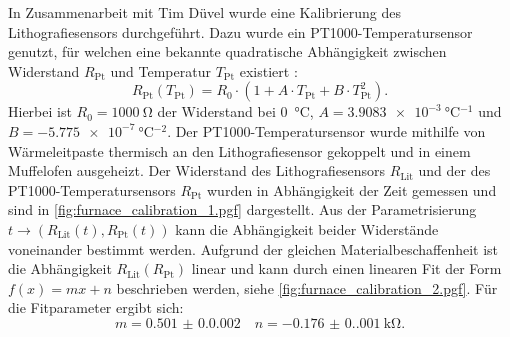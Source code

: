 In Zusammenarbeit mit Tim Düvel wurde eine Kalibrierung des Lithografiesensors durchgeführt.
Dazu wurde ein PT1000-Temperatursensor genutzt, für welchen eine bekannte quadratische Abhängigkeit zwischen Widerstand
$R_{\mathrm{Pt}}$ und Temperatur $T_{\mathrm{Pt}}$ existiert \autocite{din_pt}:
\begin{equation}
    R_{\mathrm{Pt}}(T_{\mathrm{Pt}})
    =R_0 \cdot (1 + A \cdot T_{\mathrm{Pt}} + B \cdot T_{\mathrm{Pt}}^2).
    \label{eq:pt1000_calibration}
\end{equation}
Hierbei ist $R_0 = \qty{1000}{\ohm}$ der Widerstand bei \qty{0}{\degreeCelsius},
$A = \qty{3.9083e-3}{\degreeCelsius^{-1}}$ und $B = \qty{-5.775e-7}{\degreeCelsius^{-2}}$.
Der PT1000-Temperatursensor wurde mithilfe von Wärmeleitpaste thermisch an den Lithografiesensor gekoppelt und
in einem Muffelofen ausgeheizt.
Der Widerstand des Lithografiesensors $R_\mathrm{Lit}$ und der des PT1000-Temperatursensors $R_\mathrm{Pt}$
wurden in Abhängigkeit der Zeit gemessen und sind in \cref{fig:furnace_calibration_1.pgf} dargestellt.
Aus der Parametrisierung $t \to (R_\mathrm{Lit}(t), R_\mathrm{Pt}(t))$ kann die Abhängigkeit beider Widerstände
voneinander bestimmt werden.
Aufgrund der gleichen Materialbeschaffenheit ist die Abhängigkeit $R_\mathrm{Lit}(R_\mathrm{Pt})$ linear und kann durch
einen linearen Fit der Form $f(x)=mx+n$ beschrieben werden, siehe \cref{fig:furnace_calibration_2.pgf}.
Für die Fitparameter ergibt sich:
\begin{equation*}
    m = \num{0.501(0.0002)} \quad n = \qty{-0.176(0.001)}{\kilo\ohm}.
\end{equation*}

